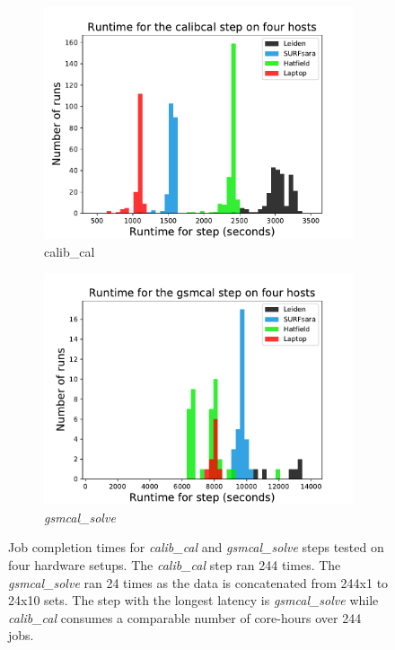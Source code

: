 
\begin{figure}
  \centering
   \begin{subfigure}{.45\linewidth}
    \includegraphics[width=\textwidth]{ch4/figures/fig3/figure3_calibcal.pdf}
    \caption{calib\_cal}
	\label{fig:ch4_calib_cal_bar}
 \end{subfigure}%
 \begin{subfigure}{.45\linewidth}
  \includegraphics[width=\textwidth]{ch4/figures/fig3/fixed-figure3_gsmcal.pdf}
  \caption{\textit{gsmcal\_solve} }
  \label{fig:ch4_gsmcal_bar}
 \end{subfigure}
    \caption[Job completion times for two processing steps tested on four hardware setups]{Job completion times for \textit{calib\_cal} and \textit{gsmcal\_solve} steps tested on four hardware setups. The \textit{calib\_cal} step ran 244 times. The \textit{gsmcal\_solve} ran 24 times as the data is concatenated from 244x1 to 24x10 sets.  The step with the longest latency is \textit{gsmcal\_solve} while \textit{calib\_cal} consumes a comparable number of core-hours over 244 jobs. } 
  \label{fig:ch4_calibcal_fitclock_bars}
\end{figure}


